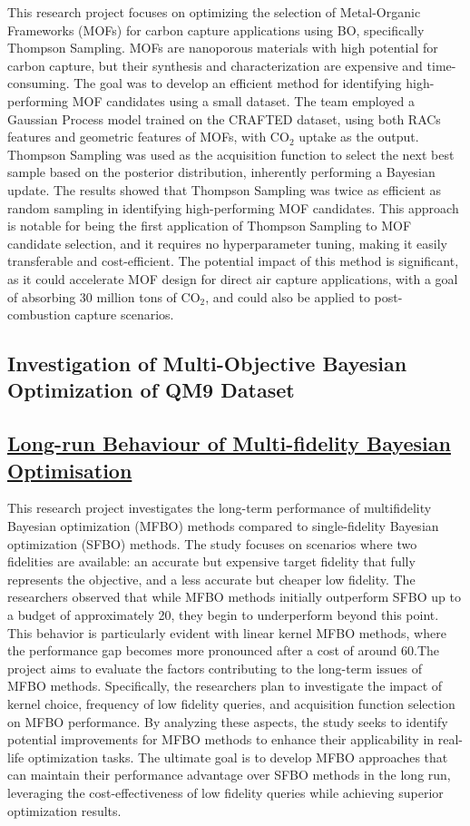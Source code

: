 This research project focuses on optimizing the selection of Metal-Organic Frameworks (MOFs) for carbon capture applications using BO, specifically Thompson Sampling. MOFs are nanoporous materials with high potential for carbon capture\cite{furukawa2013chemistry, heo2020metal}, but their synthesis and characterization are expensive and time-consuming\cite{desantis2017techno}. The goal was to develop an efficient method for identifying high-performing MOF candidates using a small dataset. The team employed a Gaussian Process model trained on the CRAFTED dataset\cite{oliveira2023crafted}, using both RACs features and geometric features of MOFs, with CO$_2$ uptake as the output. Thompson Sampling was used as the acquisition function to select the next best sample based on the posterior distribution, inherently performing a Bayesian update. The results showed that Thompson Sampling was twice as efficient as random sampling in identifying high-performing MOF candidates. This approach is notable for being the first application of Thompson Sampling to MOF candidate selection, and it requires no hyperparameter tuning, making it easily transferable and cost-efficient. The potential impact of this method is significant, as it could accelerate MOF design for direct air capture applications, with a goal of absorbing 30 million tons of CO$_2$, and could also be applied to post-combustion capture scenarios.
 \subsection*{Investigation of Multi-Objective Bayesian Optimization of QM9 Dataset}


 \subsection*{\href{https://www.youtube.com/watch?v=pegJumJEOsE}{Long-run Behaviour of Multi-fidelity Bayesian Optimisation}}

This research project investigates the long-term performance of multifidelity Bayesian optimization (MFBO) methods\cite{poloczek2017multi} compared to single-fidelity Bayesian optimization (SFBO) methods. The study focuses on scenarios where two fidelities are available: an accurate but expensive target fidelity that fully represents the objective, and a less accurate but cheaper low fidelity. The researchers observed that while MFBO methods initially outperform SFBO up to a budget of approximately 20, they begin to underperform beyond this point. This behavior is particularly evident with linear kernel MFBO methods, where the performance gap becomes more pronounced after a cost of around 60.The project aims to evaluate the factors contributing to the long-term issues of MFBO methods. Specifically, the researchers plan to investigate the impact of kernel choice, frequency of low fidelity queries, and acquisition function selection on MFBO performance. By analyzing these aspects, the study seeks to identify potential improvements for MFBO methods to enhance their applicability in real-life optimization tasks. The ultimate goal is to develop MFBO approaches that can maintain their performance advantage over SFBO methods in the long run, leveraging the cost-effectiveness of low fidelity queries while achieving superior optimization results.
